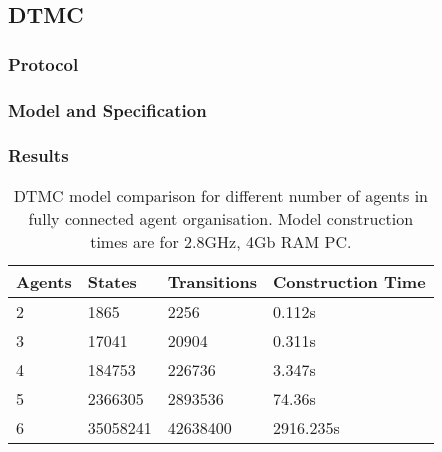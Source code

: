 \documentclass{llncs}
\begin{document}
\subsection{DTMC}
\label{subsection:DTMC}
\subsubsection{Protocol}
\subsubsection{Model and Specification}
\subsubsection{Results}


\begin{table}
 \centering
 \begin{tabular}{ | l | l | l | l |}
    \hline
    Agents & States & Transitions & Construction Time \\ \hline
    2 & 1865 & 2256 & 0.112s  \\ \hline
    3 & 17041 & 20904 & 0.311s \\ \hline
    4 & 184753 & 226736 & 3.347s \\ \hline
    5 & 2366305 & 2893536 & 74.36s \\ \hline   
    6 & 35058241 & 42638400 & 2916.235s \\ \hline   
\end{tabular}
\caption{DTMC model comparison for different number of agents in fully connected agent organisation. Model construction times are for 2.8GHz, 4Gb RAM PC.}
\end{table}
\end{document}
